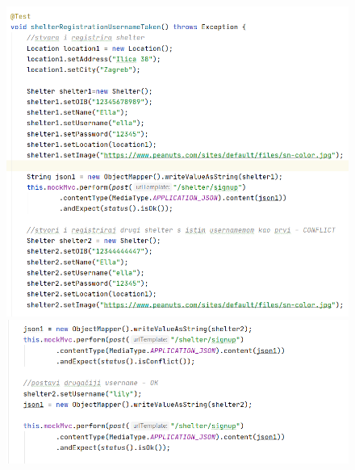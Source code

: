 		 
		 	\begin{figure}[H]
		 		\centerline{
		 			\includegraphics[scale=0.75]{slike/shelter2.1.PNG}}
	 				\hspace*{-0.22in}
	 				\includegraphics[scale=0.75]{slike/shelter2.2.PNG} %
		 		\centering
		 	\end{figure}
		 
	
	 	
	 	
	 	
